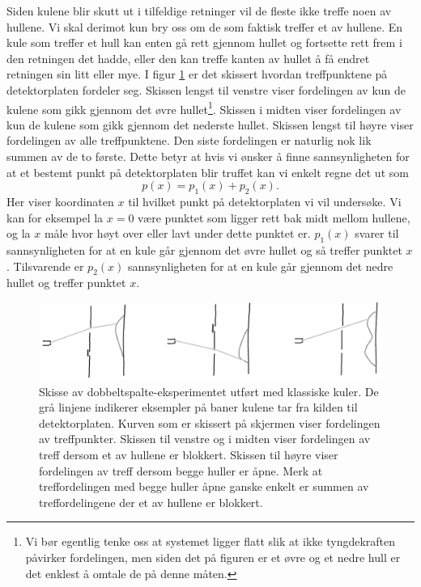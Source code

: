 Siden kulene blir skutt ut i tilfeldige retninger vil de fleste ikke treffe noen av hullene. Vi skal derimot kun bry oss om de som faktisk treffer et av hullene. En kule som treffer et hull kan enten gå rett gjennom hullet og fortsette rett frem i den retningen det hadde, eller den kan treffe kanten av hullet å få endret retningen sin litt eller mye. I figur \ref{fig:kvante:klassisktreff} er det skissert hvordan treffpunktene på detektorplaten fordeler seg. Skissen lengst til venstre viser fordelingen av kun de kulene som gikk gjennom det øvre hullet\footnote{Vi bør egentlig tenke oss at systemet ligger flatt slik at ikke tyngdekraften påvirker fordelingen, men siden det på figuren er et øvre og et nedre hull er det enklest å omtale de på denne måten.}. Skissen i midten viser fordelingen av kun de kulene som gikk gjennom det nederste hullet. Skissen lengst til høyre viser fordelingen av alle treffpunktene. Den siste fordelingen er naturlig nok lik summen av de to første. Dette betyr at hvis vi ønsker å finne sannsynligheten for at et bestemt punkt på detektorplaten blir truffet kan vi enkelt regne det ut som
\begin{displaymath}
	p(x) = p_1(x) + p_2(x).
\end{displaymath}
Her viser koordinaten $x$ til hvilket punkt på detektorplaten vi vil undersøke. Vi kan for eksempel la $x=0$ være punktet som ligger rett bak midt mellom hullene, og la $x$ måle hvor høyt over eller lavt under dette punktet er. $p_1(x)$ svarer til sannsynligheten for at en kule går gjennom det øvre hullet og så treffer punktet $x$. Tilsvarende er $p_2(x)$ sannsynligheten for at en kule går gjennom det nedre hullet og treffer punktet $x$. 
\begin{figure}[tp]
	\includegraphics[width=\textwidth]{./dobbeltspalte1}
	\caption{Skisse av dobbeltspalte-eksperimentet utført med klassiske kuler. De grå linjene indikerer eksempler på baner kulene tar fra kilden til detektorplaten. Kurven som er skissert på skjermen viser fordelingen av treffpunkter. Skissen til venstre og i midten viser fordelingen av treff dersom et av hullene er blokkert. Skissen til høyre viser fordelingen av treff dersom begge huller er åpne. Merk at treffordelingen med begge huller åpne ganske enkelt er summen av treffordelingene der et av hullene er blokkert.}
	\label{fig:kvante:klassisktreff}
\end{figure}


